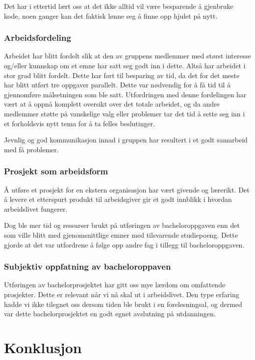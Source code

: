 Det har i ettertid lært oss at det ikke alltid vil være besparende å gjenbruke kode, noen ganger kan det faktisk lønne seg å finne opp hjulet på nytt.

\subsubsection{Arbeidsfordeling}

Arbeidet har blitt fordelt slik at den av gruppens medlemmer med størst interesse og/eller kunnskap om et emne har satt seg godt inn i dette. Altså har arbeidet i stor grad blitt fordelt. Dette har ført til besparing av tid, da det for det meste har blitt utført tre oppgaver parallelt. Dette var nødvendig for å få tid til å gjennomføre målsetningen som ble satt. Utfordringen med denne fordelingen har vært at å oppnå komplett oversikt over det totale arbeidet, og da andre medlemmer støtte på vanskelige valg eller problemer tar det tid å sette seg inn i et forholdsvis nytt tema for å ta felles beslutinger. 

Jevnlig og god kommunikasjon innad i gruppen har resultert i et godt samarbeid med få problemer. 

\subsubsection{Prosjekt som arbeidsform}

Å utføre et prosjekt for en ekstern organisasjon har vært givende og lærerikt. Det å levere et etterspurt produkt til arbeidsgiver gir et godt innblikk i hvordan arbeidslivet fungerer.

Dog ble mer tid og ressurser brukt på utføringen av bacheloroppgaven enn det som ville blitt med gjenomsnittlige emner med tilsvarende studiepoeng. Dette gjorde at det var utfordrene å følge opp andre fag i tillegg til bacheloroppgaven.

\subsubsection{Subjektiv oppfatning av bacheloroppaven}

Utføringen av bachelorprosjektet har gitt oss mye lærdom om omfattende prosjekter. Dette er relevant når vi nå skal ut i arbeidslivet. Den type erfaring hadde vi ikke tilegnet oss dersom tiden ble brukt i en forelesningsal, og dermed var dette bachelorprosjektet en godt egnet avslutning på utdanningen. 

\section{Konklusjon}

